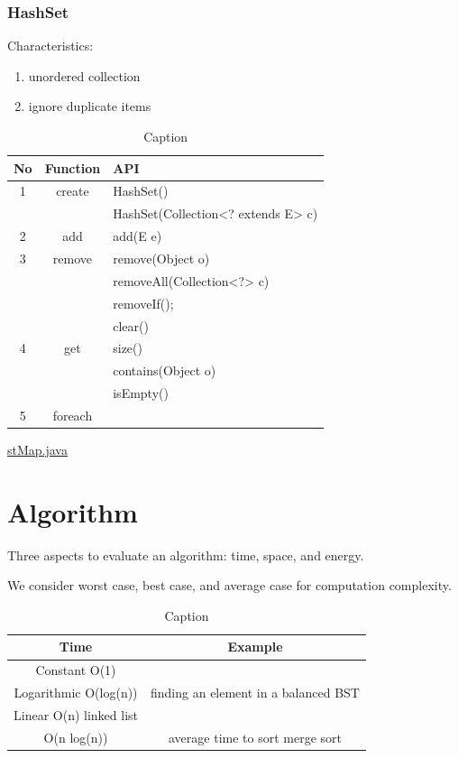 \documentclass[12pt, a4paper]{report}
\begin{document}
    \subsection{HashSet}
    Characteristics:
    \begin{enumerate}
        \item unordered collection
        \item ignore duplicate items
    \end{enumerate}
    \begin{table}[H]
        \centering
        \begin{tabular}{c|c|l}
            \toprule
            No & Function & API \\
            \hline
            1 & create & HashSet() \\
            & & HashSet(Collection<? extends E> c) \\
            \hline
            2 & add & add(E e) \\
            \hline
            3 & remove & remove(Object o) \\
            & & removeAll(Collection<?> c) \\
            & & removeIf(); \\
            & & clear() \\
            \hline
            4 & get & size() \\
            & & contains(Object o) \\
            & & isEmpty() \\
            \hline
            5 & foreach & \\
            \bottomrule
        \end{tabular}
        \caption{Caption}
        \label{tab:my_label}
    \end{table}
    
    
		
		\href{http://www.jobyme88.com}{stMap.java}


\chapter{Algorithm}
Three aspects to evaluate an algorithm: time, space, and energy. \par 
We consider worst case, best case, and average case for computation complexity. \par 
\begin{table}[H]
    \centering
    \begin{tabular}{c|c}
        \toprule
         Time & Example  \\
         \hline
         Constant O(1) &  \\
         \hline
         Logarithmic O(log(n))& finding an element in a balanced BST \\
         Linear O(n) linked list &  \\
         O(n log(n)) & average time to sort merge sort \\
         \bottomrule
    \end{tabular}
    \caption{Caption}
    \label{tab:my_label}
\end{table}
\end{document}
